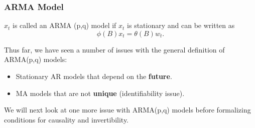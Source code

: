 \documentclass[%
xcolor=pdftex]{beamer}
\begin{document}
\begin{frame}
\frametitle{ARMA Model}

$x_t$ is called an ARMA (p,q) model if $x_t$ is stationary and
can be written as
 $$
 \phi(B) x_t=\theta(B) w_t.
 $$

Thus far, we have seen a number of issues with the general definition of ARMA(p,q) models:

\begin{itemize}
\item Stationary AR models that depend on the \textbf{future}.
\item MA models that are not \textbf{unique} (identifiability issue).
\end{itemize}

We will next look at one more issue with ARMA(p,q) models before formalizing conditions for causality and invertibility.

\end{frame}
\end{document}
